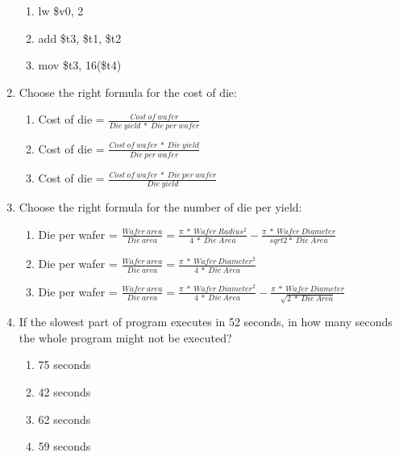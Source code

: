 \documentclass[paper=8.2in:11.6in]{scrartcl}
\begin{document}
\begin{enumerate}
\begin{enumerate}[label=\alph*)]
\item lw \$v0, 2
\item add \$t3, \$t1, \$t2
\item mov \$t3, 16(\$t4)

\end{enumerate}

\item Choose the right formula for the cost of die:

\begin{enumerate}[label=\alph*.]

\item Cost of die = $ \frac{Cost \ of \ wafer}{Die \ yield \ * \ Die \ per \ wafer} $
\item Cost of die = $ \frac{Cost \ of \ wafer \ * \ Die \ yield}{Die \ per \ wafer} $
\item Cost of die = $ \frac{Cost \ of \ wafer \ * \ Die \ per \ wafer}{Die \ yield} $

\end{enumerate}

\item Choose the right formula for the number of die per yield:

\begin{enumerate}[label=\alph*.]

\item Die per wafer = $ \frac{Wafer \ area}{Die \ area} = \frac{\pi \ * \ Wafer \ Radius^{2}}{4 \ * \ Die \ Area} - \frac{\pi \ * \ Wafer \ Diameter}{sqrt{2* \ Die \ Area}} $
\item Die per wafer = $ \frac{Wafer \ area}{Die \ area} = \frac{\pi \ * \ Wafer \ Diameter^{2}}{4 \ * \ Die \ Area} $
\item Die per wafer = $ \frac{Wafer \ area}{Die \ area} = \frac{\pi \ * \ Wafer \ Diameter^{2}}{4 \ * \ Die \ Area} - \frac{\pi \ * \ Wafer \ Diameter}{\sqrt{2 \ * \ Die \ Area}} $

\end{enumerate}

\item If the slowest part of program executes in 52 seconds, in how many seconds the whole program might not be executed?

\begin{enumerate}[label=\alph*)]

\item 75 seconds
\item 42 seconds
\item 62 seconds
\item 59 seconds

\end{enumerate}

\end{enumerate}
\end{document}
